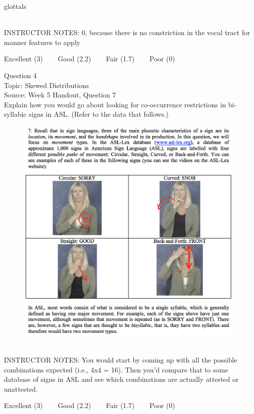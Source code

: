 \documentclass[12pt]{article}
\begin{document}
glottals


~\\
INSTRUCTOR NOTES: 0, because there is no constriction in the vocal tract for manner features to apply


\vfill
Excellent (3) ~~~ Good (2.2) ~~~ Fair (1.7) ~~~ Poor (0)
\newpage

{\large Question 4}\\

Topic: Skewed Distributions\\
Source: Week 5 Handout, Question 7\\

Explain how you would go about looking for co-occurrence restrictions in bi-syllabic signs in ASL. (Refer to the data that follows.)\\

\begin{figure}[H]
\includegraphics{../images/ASL_movement.png}
\end{figure}

~\\
INSTRUCTOR NOTES: You would start by coming up with all the possible combinations expected (i.e., 4x4 = 16). Then you'd compare that to some database of signs in ASL and see which combinations are actually attested or unattested.


\vfill
Excellent (3) ~~~ Good (2.2) ~~~ Fair (1.7) ~~~ Poor (0)
\newpage
\end{document}
